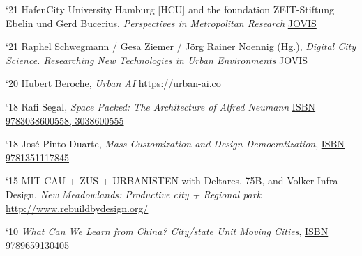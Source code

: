 \begin{tablist}
    \item[`21] \tab HafenCity University Hamburg [HCU] and the foundation ZEIT-Stiftung Ebelin und Gerd Bucerius, \textit{Perspectives in Metropolitan Research}
    \href{https://www.jovis.de/en/books/series/perspectives-in-metropolitan-research.html}{JOVIS}

    \item[`21] \tab Raphel Schwegmann / Gesa Ziemer / Jörg Rainer Noennig (Hg.), \textit{Digital City Science. Researching New Technologies in Urban Environments}
    \href{https://www.jovis.de/de/buecher/details/product/digital-city-science-researching-new-technologies-in-urban-environments.html}{JOVIS}

    \item[`20] \tab Hubert Beroche, \textit{Urban AI}
    \href{https://urban-ai.co/wp-content/uploads/2020/06/URBAN-AI-1.pdf}{https://urban-ai.co}

    \item[`18] \tab Rafi Segal, \textit{Space Packed: The Architecture of Alfred Neumann}
    \href{https://www.amazon.com/Space-Packed-Architecture-Alfred-Neumann/dp/3038600555}{ISBN 9783038600558, 3038600555}


    \item[`18] \tab José Pinto Duarte, \textit{Mass Customization and Design Democratization},
    \href{https://www.google.com/books/edition/_/Z6h8DwAAQBAJ?hl=en&gbpv=0}{ISBN 9781351117845}


    \item[`15] \tab MIT CAU + ZUS + URBANISTEN with Deltares, 75B, and Volker Infra Design, \textit{New Meadowlands: Productive city + Regional park}
    \href{http://www.rebuildbydesign.org/our-work/all-proposals/winning-projects/nj-meadowlands}{http://www.rebuildbydesign.org/}

    \item[`10] \tab \textit{What Can We Learn from China? City/state Unit Moving Cities},
    \href{https://movingcities.org/movingmemos/the-chinese-city-lecture-workshop/}{ISBN 9789659130405}


\end{tablist}

